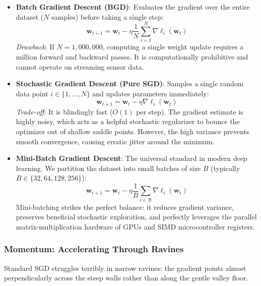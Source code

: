 \begin{itemize}
    \item \textbf{Batch Gradient Descent (BGD)}: Evaluates the gradient over the entire dataset ($N$ samples) before taking a single step:
    \begin{equation}
    \mathbf{w}_{t+1} = \mathbf{w}_t - \eta \frac{1}{N} \sum_{i=1}^{N} \nabla \ell_i(\mathbf{w}_t)\label{eq:bgd_update}
    \end{equation}
    \textit{Drawback}: If $N = 1{,}000{,}000$, computing a single weight update requires a million forward and backward passes. It is computationally prohibitive and cannot operate on streaming sensor data.

    \item \textbf{Stochastic Gradient Descent (Pure SGD)}: Samples a single random data point $i \in \{1, \dots, N\}$ and updates parameters immediately:
    \begin{equation}
    \mathbf{w}_{t+1} = \mathbf{w}_t - \eta \nabla \ell_i(\mathbf{w}_t)\label{eq:pure_sgd_update}
    \end{equation}
    \textit{Trade-off}: It is blindingly fast ($O(1)$ per step). The gradient estimate is highly noisy, which acts as a helpful stochastic regularizer to bounce the optimizer out of shallow saddle points. However, the high variance prevents smooth convergence, causing erratic jitter around the minimum.

    \item \textbf{Mini-Batch Gradient Descent}: The universal standard in modern deep learning. We partition the dataset into small batches of size $B$ (typically $B \in \{32, 64, 128, 256\}$):
    \begin{equation}
    \mathbf{w}_{t+1} = \mathbf{w}_t - \eta \frac{1}{B} \sum_{i \in \mathcal{B}} \nabla \ell_i(\mathbf{w}_t)\label{eq:minibatch_update}
    \end{equation}
    Mini-batching strikes the perfect balance: it reduces gradient variance, preserves beneficial stochastic exploration, and perfectly leverages the parallel matrix-multiplication hardware of GPUs and SIMD microcontroller registers.
\end{itemize}

\subsubsection{Momentum: Accelerating Through Ravines}
Standard SGD struggles terribly in narrow ravines: the gradient points almost perpendicularly across the steep walls rather than along the gentle valley floor.

